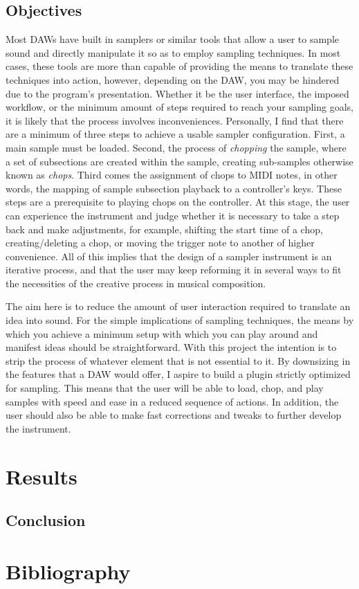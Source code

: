\documentclass[12pt , a4paper]{article}
\begin{document}
	\newpage
	\subsection{Objectives}
	Most DAWs have built in samplers or similar tools that allow a user to sample sound and directly manipulate it so as to employ sampling techniques. In most cases, these tools are more than capable of providing the means to translate these techniques into action, however, depending on the DAW, you may be hindered due to the program's presentation. Whether it be the user interface, the imposed workflow, or the minimum amount of steps required to reach your sampling goals, it is likely that the process involves inconveniences. Personally, I find that there are a minimum of three steps to achieve a usable sampler configuration. First, a main sample must be loaded. Second, the process of \textit{chopping} the sample, where a set of subsections are created within the sample, creating sub-samples otherwise known as \textit{chops}. Third comes the assignment of chops to MIDI notes, in other words, the mapping of sample subsection playback to a controller's keys. These steps are a prerequisite to playing chops on the controller. At this stage, the user can experience the instrument and judge whether it is necessary to take a step back and make adjustments, for example, shifting the start time of a chop, creating/deleting a chop, or moving the trigger note to another of higher convenience. All of this implies that the design of a sampler instrument is an iterative process, and that the user may keep reforming it in several ways to fit the necessities of the creative process in musical composition.
	\par	
	The aim here is to reduce the amount of user interaction required to translate an idea into sound. For the simple implications of sampling techniques, the means by which you achieve a minimum setup with which you can play around and manifest ideas should be straightforward. With this project the intention is to strip the process of whatever element that is not essential to it. By downsizing in the features that a DAW would offer, I aspire to build a plugin strictly optimized for sampling. This means that the user will be able to load, chop, and play samples with speed and ease in a reduced sequence of actions. In addition, the user should also be able to make fast corrections and tweaks to further develop the instrument. 
	
	\newpage
	\section{Results}
	
	\subsection{Conclusion}
	 
	\newpage
	\section{Bibliography}
	
\end{document}
